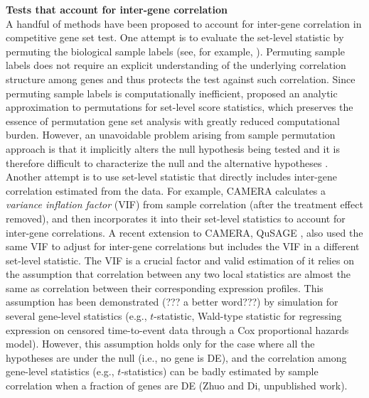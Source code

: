 \documentclass[useAMS,usenatbib, galley]{biom}
\newcommand{\thepapertobefinished}{Zhuo and Di, unpublished work}
\begin{document}
	\textbf{Tests that account for inter-gene correlation}\\
	A handful of methods have been proposed to account for inter-gene correlation in competitive gene set test. One attempt is to evaluate the set-level statistic by permuting the biological sample labels (see, for example, \cite{subramanian2005gene, efron2007testing}). Permuting sample labels does not require an explicit understanding of the underlying correlation structure among genes and thus protects the test against such correlation. Since permuting sample labels is computationally inefficient, \cite{zhou2013empirical} proposed an analytic approximation to permutations for set-level score statistics, which preserves the essence of permutation gene set analysis with greatly reduced computational burden. However, an unavoidable problem arising from sample permutation approach is that it implicitly alters the null hypothesis being tested and it is therefore difficult to characterize the null and the alternative hypotheses \citep{goeman2007analyzing, khatri2012ten, wu2012camera}. Another attempt is to use set-level statistic that directly includes inter-gene correlation estimated from the data. For example, CAMERA \citep{wu2012camera} calculates a \textit{variance inflation factor} (VIF) from sample correlation (after the treatment effect removed), and then incorporates it into their set-level statistics to account for inter-gene correlations. A recent extension to CAMERA,  QuSAGE \citep{yaari2013quantitative}, also used the same VIF to adjust for inter-gene correlations but includes the VIF in a different set-level statistic. The VIF is a crucial factor and valid estimation of it relies on the assumption that correlation between any two local statistics are almost the same as correlation between their corresponding expression profiles. This assumption has been demonstrated (??? a better word???) by simulation \citep{barry2008statistical} for several gene-level statistics (e.g., $t$-statistic, Wald-type statistic for regressing expression on censored time-to-event data through a Cox proportional hazards model). However, this assumption holds only for the case where all the hypotheses are under the null (i.e., no gene is DE), and the correlation among gene-level statistics (e.g., $t$-statistics) can be badly estimated by sample correlation when a fraction of genes are DE (\thepapertobefinished). 
	
\end{document}

